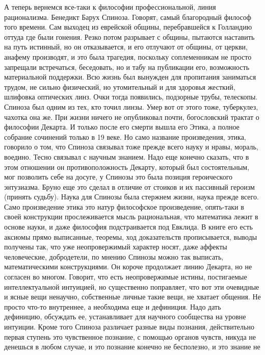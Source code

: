 \documentclass[a4paper, 12pt]{article}
\begin{document}
А теперь вернемся все-таки к философии профессиональной, линия 
рационализма. Бенедикт Барух Спиноза. Говорят, самый благородный философ 
того времени. Сам выходец из еврейской общины, перебравшейся к Голландию 
оттуда где были гонения. Резко потом разрывает с общины, пытаются 
наставить на путь истинный, но он отказывается, и его отлучают от 
общины, от церкви, анафему производят, и это была трагедия, поскольку 
соплеменникам не просто запрещали встречаться, беседовать, но и табу на 
публикации его, возможность материальной поддержки. Всю жизнь был 
вынужден для пропитания заниматься трудом, не сильно физический, но 
утомительный и для здоровья жесткий, шлифовка оптических линз. Очки 
тогда появились, подзорные трубы, телескопы. Спиноза был одним из тех, 
кто точил линзы. Умер вот от этого тоже, туберкулез, чахотка она же. При 
жизни ничего не опубликовал почти, богословский трактат о философии 
Декарта. И только после его смерти вышла его Этика, а полное собрание 
сочинений только в 19 веке. Но само название произведения, этика, 
говорило о том, что Спиноза связывал тоже прежде всего науку и нравы, 
мораль, воедино. Тесно связывал с научным знанием. Надо еще конечно 
сказать, что в этом отношении он противоположность Декарту, который был 
состоятельным, мог позволить себе на досуге, у Спинозы это была позиция 
героического энтузиазма. Бруно еще это сделал в отличие от стоиков и их 
пассивный героизм (принять судьбу). Наука для Спинозы была стержнем 
жизни, наука прежде всего. Само произведение этика это натур философское 
произведение, опять-таки в своей конструкции прослеживается мысль 
рациональная, что математика лежит в основе науки, и даже философия 
подстраивается под Евклида. В книге его есть аксиомы прямо выписанные, 
теоремы, ход доказательств прописывается, выводы получены так, что уже 
неопровержимый характер носят, даже аффекты человеческие, добродетели, 
по мнению Спинозы можно так выписать, математическими конструкциями. Он 
короче продолжает линию Декарта, но не согласен во многом. Говорит, что 
есть неопровержимые истины, постигаемые интеллектуальной интуицией, но 
существенно поправляет, что вот эти очевидные и ясные вещи ненаучно, 
собственные личные такие вещи, не хватает общения. Не просто что-то 
внутреннее, а необходима еще и дефиниция. Надо дать дефиницию, обсуждать 
ее, устанавливает для научного сообщества на уровне интуиции. Кроме того 
Спиноза различает разные виды познания, действительно первая ступень это 
чувственное познание, с помощью органов чувств, никуда не денешься 
в любом случае, и это познание конечно не бесполезно, и это знание не 
\end{document}
